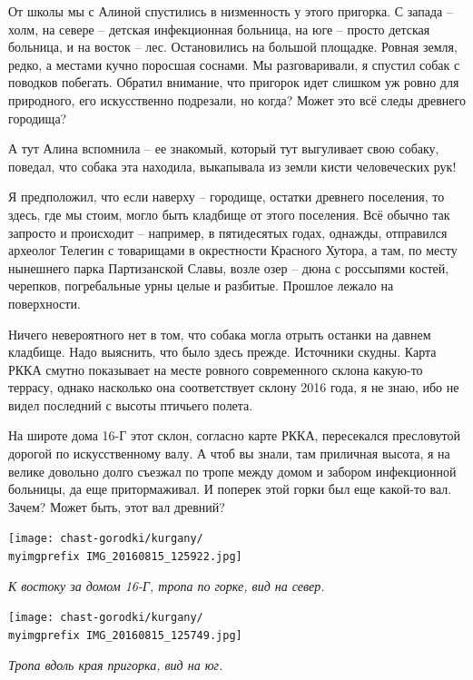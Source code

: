 От школы мы с Алиной спустились в низменность у этого пригорка. С запада – холм, на севере – детская инфекционная больница, на юге – просто детская больница, и на восток – лес. Остановились на большой площадке. Ровная земля, редко, а местами кучно поросшая соснами. Мы разговаривали, я спустил собак с поводков побегать. Обратил внимание, что пригорок идет слишком уж ровно для природного, его искусственно подрезали, но когда? Может это всё следы древнего городища?

А тут Алина вспомнила – ее знакомый, который тут выгуливает свою собаку, поведал, что собака эта находила, выкапывала из земли кисти человеческих рук!

Я предположил, что если наверху – городище, остатки древнего поселения, то здесь, где мы стоим, могло быть кладбище от этого поселения. Всё обычно так запросто и происходит – например, в пятидесятых годах, однажды, отправился археолог Телегин с товарищами в окрестности Красного Хутора, а там, по месту нынешнего парка Партизанской Славы, возле озер – дюна с россыпями костей, черепков, погребальные урны целые и разбитые. Прошлое лежало на поверхности.

Ничего невероятного нет в том, что собака могла отрыть останки на давнем кладбище. Надо выяснить, что было здесь прежде. Источники скудны. Карта РККА смутно показывает на месте ровного современного склона какую-то террасу, однако насколько она соответствует склону 2016 года, я не знаю, ибо не видел последний с высоты птичьего полета.

На широте дома 16-Г этот склон, согласно карте РККА, пересекался пресловутой дорогой по искусственному валу. А чтоб вы знали, там приличная высота, я на велике довольно долго съезжал по тропе между домом и забором инфекционной больницы, да еще притормаживал. И поперек этой горки был еще какой-то вал. Зачем? Может быть, этот вал древний?

\begin{center}
\texttt{[image: chast-gorodki/kurgany/\\myimgprefix IMG\_20160815\_125922.jpg]}

\textit{К востоку за домом 16-Г, тропа по горке, вид на север.}
\end{center}

\begin{center}
\texttt{[image: chast-gorodki/kurgany/\\myimgprefix IMG\_20160815\_125749.jpg]}

\textit{Тропа вдоль края пригорка, вид на юг.}
\end{center}

